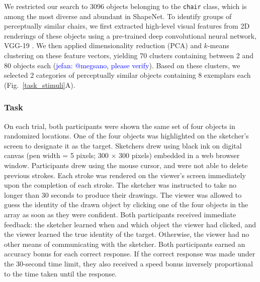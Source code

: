 \documentclass[10pt,letterpaper]{article}
\newcommand{\jefan}[1]{\textcolor{Blue}{jefan: #1}}
\begin{document}
We restricted our search to 3096 objects belonging to the \texttt{chair} class, which is among the most diverse and abundant in ShapeNet.
To identify groups of perceptually similar chairs, we first extracted high-level visual features from 2D renderings of these objects using a pre-trained deep convolutional neural network, VGG-19 \cite{simonyan2014very}.
We then applied dimensionality reduction (PCA) and $k$-means clustering on these feature vectors, yielding 70 clusters containing between 2 and 80 objects each (\jefan{@megsano, please verify}).
Based on these clusters, we selected 2 categories of perceptually similar objects containing 8 exemplars each (Fig.~\ref{task_stimuli}A).

\subsubsection{Task}

On each trial, both participants were shown the same set of four objects in randomized locations.
One of the four objects was highlighted on the sketcher's screen to designate it as the target.
Sketchers drew using black ink on digital canvas (pen width = 5 pixels; 300 $\times$ 300 pixels) embedded in a web browser window.
Participants drew using the mouse cursor, and were not able to delete previous strokes.
Each stroke was rendered on the viewer's screen immediately upon the completion of each stroke.
The sketcher was instructed to take no longer than 30 seconds to produce their drawings.
The viewer was allowed to guess the identity of the drawn object by clicking one of the four objects in the array as soon as they were confident.
Both participants received immediate feedback: the sketcher learned when and which object the viewer had clicked, and the viewer learned the true identity of the target.
Otherwise, the viewer had no other means of communicating with the sketcher.
Both participants earned an accuracy bonus for each correct response.
If the correct response was made under the 30-second time limit, they also received a speed bonus inversely proportional to the time taken until the response.
\end{document}
